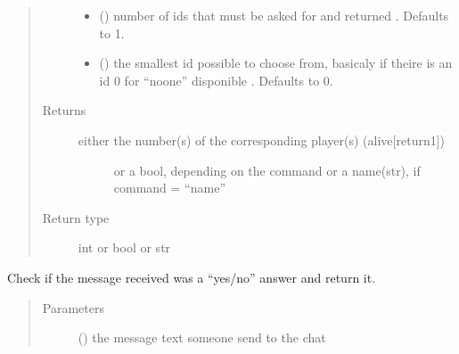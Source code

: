 \documentclass[letterpaper,10pt,english]{sphinxmanual}
\begin{document}
\begin{fulllineitems}
\begin{fulllineitems}
\begin{quote}
\begin{description}
\begin{itemize}
\item {} 
 (\sphinxstyleliteralemphasis{\sphinxupquote{, }}) \textendash{} number of ids that must be asked for and returned . Defaults to 1.

\item {} 
 (\sphinxstyleliteralemphasis{\sphinxupquote{, }}) \textendash{} the smallest id possible to choose from,
basicaly if theire is an id 0 for “noone” disponible . Defaults to 0.

\end{itemize}

\item[{Returns}] \leavevmode
\begin{description}
\item[{either the number(s) of the corresponding player(s) (alive{[}return\sphinxhyphen{}1{]})}] \leavevmode
or a bool, depending on the command
or a name(str), if command = “name”

\end{description}


\item[{Return type}] \leavevmode
int or bool or str

\end{description}\end{quote}

\end{fulllineitems}


\begin{fulllineitems}
\label{\detokenize{chatwolf:chatwolf.skypecommands.SkypeCommands.get_bool}}
Check if the message received was a “yes/no” answer and return it.
\begin{quote}\begin{description}
\item[{Parameters}] \leavevmode
{} () \textendash{} the message text someone send to the chat


\end{description}
\end{quote}
\end{fulllineitems}
\end{fulllineitems}
\end{document}

